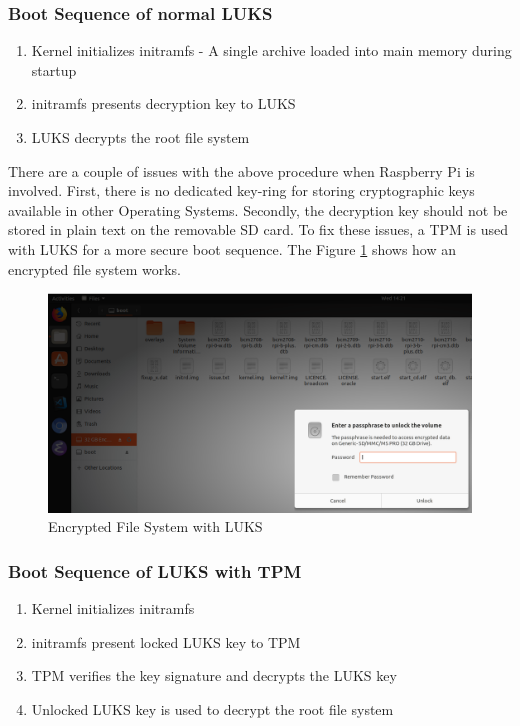 \documentclass[11pt,openright]{report}
\begin{document}
\subsubsection{Boot Sequence of normal LUKS}
\renewcommand{\theenumi}{\roman{enumi}}%
\begin{enumerate}
	\item Kernel initializes initramfs - A single archive loaded into main memory during startup
	\item initramfs presents decryption key to LUKS
	\item LUKS decrypts the root file system
\end{enumerate}

There are a couple of issues with the above procedure when Raspberry Pi is involved. First, there is no dedicated key-ring for storing cryptographic keys available in other Operating Systems. Secondly, the decryption key should not be stored in plain text on the removable SD card. To fix these issues, a TPM is used with LUKS \cite{TPMLUKS} for a more secure boot sequence. The Figure \ref{fig:encrypted_fs} shows how an encrypted file system works.

\begin{figure}
    \centering
    \includegraphics[scale=0.5]{images/2_LUKSEncryptedFormat.png}
    \caption{Encrypted File System with LUKS}
    \label{fig:encrypted_fs}
\end{figure}

\subsubsection{Boot Sequence of LUKS with TPM}
\renewcommand{\theenumi}{\roman{enumi}}%
\begin{enumerate}
	\item Kernel initializes initramfs
	\item initramfs present locked LUKS key to TPM
	\item TPM verifies the key signature and decrypts the LUKS key
	\item Unlocked LUKS key is used to decrypt the root file system
\end{enumerate}
\end{document}
